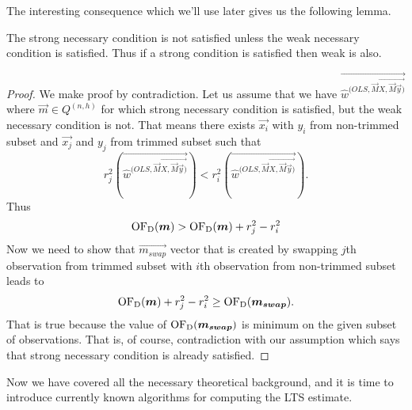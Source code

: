 The interesting consequence which we'll use later gives us the following lemma.

\begin{lemma} \label{lemma_conditions}
    The strong necessary condition is not satisfied unless the weak necessary condition is satisfied. Thus if a strong condition is satisfied then weak is also. 
\end{lemma}

\begin{proof}
		We make proof by contradiction. Let us assume that we have $\vec{\hat{w}^{(OLS, \vec{M}\vec{X, \vec{M}\vec{y})} }}$ where $\vec{m} \in Q^{(n, h)}$ for which strong necessary condition is satisfied, but the weak necessary condition is not. That means there exists $\vec{x_i}$ with $y_i$ from non-trimmed subset and $\vec{x_j}$ and $y_j$ from trimmed subset such that
		\begin{equation*} 
			r_j^2(\vec{\hat{w}^{(OLS, \vec{M}\vec{X, \vec{M}\vec{y})} }}) < r_i^2(\vec{\hat{w}^{(OLS, \vec{M}\vec{X, \vec{M}\vec{y})} }}).
	\end{equation*}
		 Thus 
    \begin{equation} 
        \operatorname{OF_D}(\boldsymbol{m}) > \operatorname{OF_D}(\boldsymbol{m}) + r_j^2 - r_i^2  
    \end{equation}
Now we need to show that $\vec{m_{swap}}$ vector that is created by swapping $j$th observation from trimmed subset with $i$th observation from non-trimmed subset leads to 
    \begin{equation} 
      \operatorname{OF_D}(\boldsymbol{m}) + r_j^2 - r_i^2  \geq \operatorname{OF_D}(\boldsymbol{m_{swap}}).
    \end{equation}
That is true because the value of $\operatorname{OF_D}(\boldsymbol{m_{swap}})$  is minimum on the given subset of observations. That is, of course, contradiction with our assumption which says that strong necessary condition is already satisfied. 
\end{proof}

Now we have covered all the necessary theoretical background, and it is time to introduce currently known algorithms for computing the LTS estimate.






